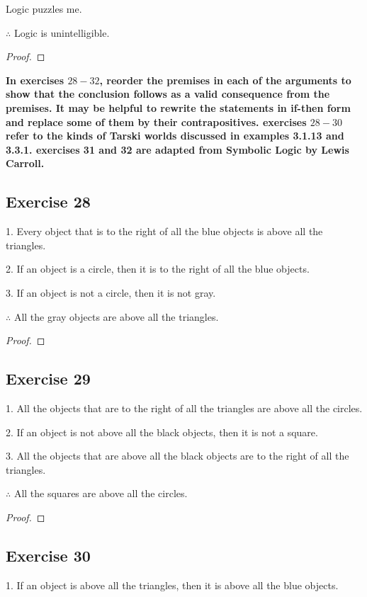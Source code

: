 \documentclass[14pt]{extarticle}
\begin{document}
Logic puzzles me.

$\therefore$ Logic is unintelligible.

\begin{proof}

\end{proof}

{\bf \color{cyan} In exercises $28-32$, reorder the premises in each of the arguments to show that the conclusion follows as a valid consequence from the premises. It may be helpful to rewrite the statements in if-then form and replace some of them by their contrapositives. exercises $28-30$ refer to the kinds of Tarski worlds discussed in examples 3.1.13 and 3.3.1. exercises 31 and 32 are adapted from Symbolic Logic by Lewis Carroll.}

\subsection{Exercise 28}
1. Every object that is to the right of all the blue objects is above all the triangles.

2. If an object is a circle, then it is to the right of all the blue objects.

3. If an object is not a circle, then it is not gray. 

$\therefore$ All the gray objects are above all the triangles.

\begin{proof}

\end{proof}

\subsection{Exercise 29}
1. All the objects that are to the right of all the triangles are above all the circles.

2. If an object is not above all the black objects, then it is not a square.

3. All the objects that are above all the black objects are to the right of all the triangles.

$\therefore$ All the squares are above all the circles.

\begin{proof}

\end{proof}

\subsection{Exercise 30}
1. If an object is above all the triangles, then it is above all the blue objects.
\end{document}

